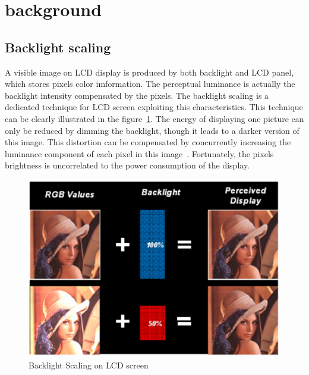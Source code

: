 \section{background}
\label{sec:background}

\subsection{Backlight scaling}
A visible image on LCD display is produced by both backlight and LCD
panel, which stores pixels color imformation. The perceptual luminance
is actually the backlight intensity compensated by the pixels. The
backlight scaling is a dedicated technique for LCD screen exploiting
this characteristics. This technique can be clearly illustrated in the
figure~\ref{fig:backlightscaling}. The energy of displaying one
picture can only be reduced by dimming the backlight, though it leads
to a darker version of this image. This distortion can be compensated
by concurrently increasing the luminance component of each pixel in
this image~\cite{PMLDV03, CHP07, CCS06, CSC02}. Fortunately, the
pixels brightness is uncorrelated to the power consumption of the
display.


\begin{figure}[!htb]
  \begin{center}
    \includegraphics[scale=.75]{./figures/backlightscaling.eps}
    \caption{Backlight Scaling on LCD screen}
    \label{fig:backlightscaling}
  \end{center}
\end{figure}

